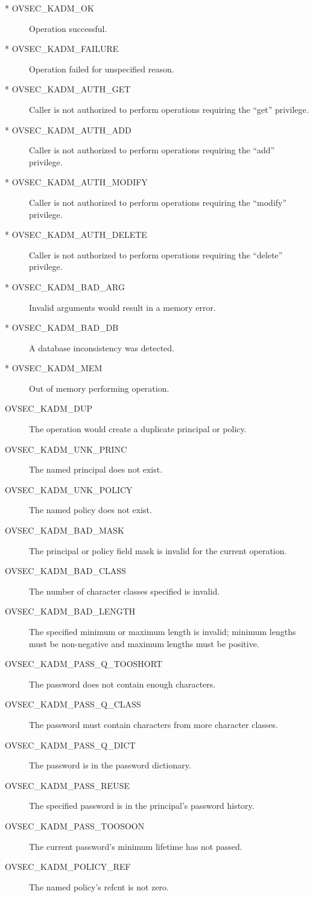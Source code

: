 \begin{description}
\item[* OVSEC_KADM_OK] Operation successful.
\item[* OVSEC_KADM_FAILURE] Operation failed for unspecified reason.
\item[* OVSEC_KADM_AUTH_GET] Caller is not authorized to perform
operations requiring the ``get'' privilege.
\item[* OVSEC_KADM_AUTH_ADD] Caller is not authorized to perform
operations requiring the ``add'' privilege.
\item[* OVSEC_KADM_AUTH_MODIFY] Caller is not authorized to perform
operations requiring the ``modify'' privilege.
\item[* OVSEC_KADM_AUTH_DELETE] Caller is not authorized to perform
operations requiring the ``delete'' privilege.
\item[* OVSEC_KADM_BAD_ARG] Invalid arguments would result in a memory
error.
\item[* OVSEC_KADM_BAD_DB] A database inconsistency was detected.
\item[* OVSEC_KADM_MEM] Out of memory performing operation.
\item[OVSEC_KADM_DUP] The operation would create a duplicate principal or
policy.
\item[OVSEC_KADM_UNK_PRINC]  The named principal does not exist.
\item[OVSEC_KADM_UNK_POLICY] The named policy does not exist.
\item[OVSEC_KADM_BAD_MASK] The principal or policy field mask is invalid
for the current operation.
\item[OVSEC_KADM_BAD_CLASS] The number of character classes specified
is invalid.
\item[OVSEC_KADM_BAD_LENGTH] The specified minimum or maximum length
is invalid; minimum lengths must be non-negative and maximum lengths
must be positive.
\item[OVSEC_KADM_PASS_Q_TOOSHORT] The password does not contain enough
characters.
\item[OVSEC_KADM_PASS_Q_CLASS] The password must contain characters
from more character classes.
\item[OVSEC_KADM_PASS_Q_DICT] The password is in the password
dictionary.
\item[OVSEC_KADM_PASS_REUSE] The specified password is in the principal's
password history.
\item[OVSEC_KADM_PASS_TOOSOON] The current password's minimum lifetime
has not passed.
\item[OVSEC_KADM_POLICY_REF] The named policy's refcnt is not zero.
\end{description}


